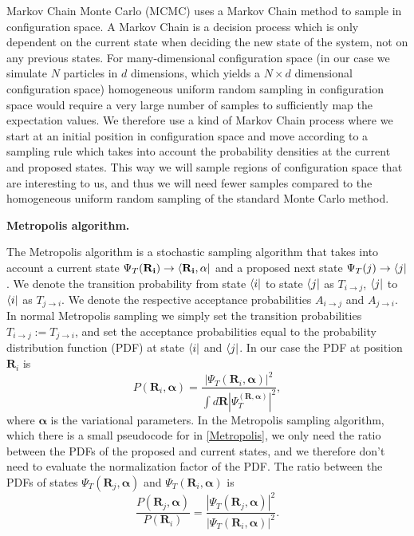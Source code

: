 Markov Chain Monte Carlo (MCMC) uses a Markov Chain method to sample in configuration space. A Markov Chain is a decision process which is only dependent on the current state when deciding the new state of the system, not on any previous states. For many-dimensional configuration space (in our case we simulate $N$ particles in $d$ dimensions, which yields a $N\times d$ dimensional configuration space) homogeneous uniform random sampling in configuration space would require a very large number of samples to sufficiently map the expectation values. We therefore use a kind of Markov Chain process where we start at an initial position in configuration space and move according to a sampling rule which takes into account the probability densities at the current and proposed states. This way we will sample regions of configuration space that are interesting to us, and thus we will need fewer samples compared to the homogeneous uniform random sampling of the standard Monte Carlo method. 

\textbf{Metropolis algorithm.}

The Metropolis algorithm is a stochastic sampling algorithm that takes into account a current state $\Psi_T(\mathbf{R_i})\to\bra{\mathbf{R_i}, \alpha}$ and a proposed next state $\Psi_T(j)\to\bra{j}$. We denote the transition probability from state $\bra{i}$ to state $\bra{j}$ as $T_{i\to j}$, $\bra{j}$ to $\bra{i}$ as $T_{j\to i}$. We denote the respective acceptance probabilities $A_{i\to j}$ and $A_{j\to i}$. In normal Metropolis sampling we simply set the transition probabilities $T_{i\to j}:=T_{j\to i}$, and set the acceptance probabilities equal to the probability distribution function (PDF) at state $\bra{i}$ and $\bra{j}$. In our case the PDF at position $\mathbf{R}_i$ is
\begin{equation}
    P(\mathbf{R}_i, \mathbf{\alpha}) = \frac{|\Psi_T(\mathbf{R}_i, \mathbf{\alpha})|^2}{\int d\mathbf{R}|\Psi_T^(\mathbf{R}, \mathbf{\alpha})|^2}, 
\end{equation}
where $\mathbf{\alpha}$ is the variational parameters. In the Metropolis sampling algorithm, which there is a small pseudocode for in \ref{Metropolis}, we only need the ratio between the PDFs of the proposed and current states, and we therefore don't need to evaluate the normalization factor of the PDF. The ratio between the PDFs of states $\Psi_T(\mathbf{R}_{j}, \mathbf{\alpha})$ and $\Psi_T(\mathbf{R}_i, \mathbf{\alpha})$ is 
\begin{equation}
    \frac{P(\mathbf{R}_j, \mathbf{\alpha})}{P(\mathbf{R}_i)} = \frac{|\Psi_T(\mathbf{R}_j, \mathbf{\alpha})|^2}{|\Psi_T(\mathbf{R}_i, \mathbf{\alpha})|^2}.
\end{equation}


